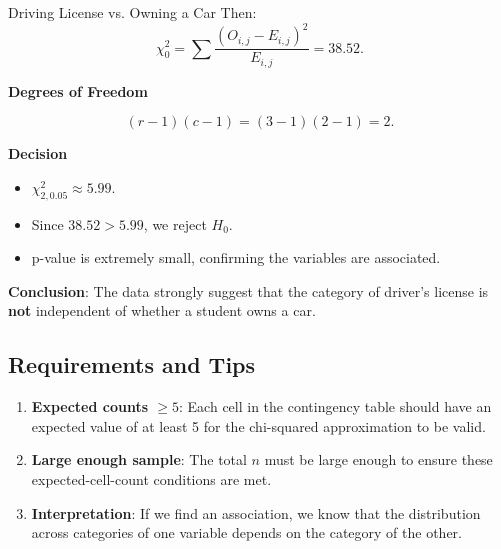 \documentclass[10pt]{extarticle}
\begin{document}
\begin{examplebox}{Driving License vs. Owning a Car}{}
Then:
\[
\chi^2_0 
= \sum \frac{(O_{i,j} - E_{i,j})^2}{E_{i,j}}
= 38.52.
\]

\textbf{Degrees of Freedom}

\[
(r - 1)(c - 1) = (3 - 1)(2 - 1) = 2.
\]

\textbf{Decision}

\begin{itemize}
    \item $\chi^2_{2,0.05}\approx 5.99$.
    \item Since $38.52 > 5.99$, we reject $H_0$.
    \item p-value is extremely small, confirming the variables are associated.
\end{itemize}

\textbf{Conclusion}: The data strongly suggest that the category of driver's license is \textbf{not} independent of whether a student owns a car.
\end{examplebox}


\subsection{Requirements and Tips}

\begin{enumerate}
    \item \textbf{Expected counts $\ge 5$}: Each cell in the contingency table should have an expected value of at least 5 for the chi-squared approximation to be valid.
    \item \textbf{Large enough sample}: The total $n$ must be large enough to ensure these expected-cell-count conditions are met.
    \item \textbf{Interpretation}: If we find an association, we know that the distribution across categories of one variable depends on the category of the other.
\end{enumerate}
\end{document}
